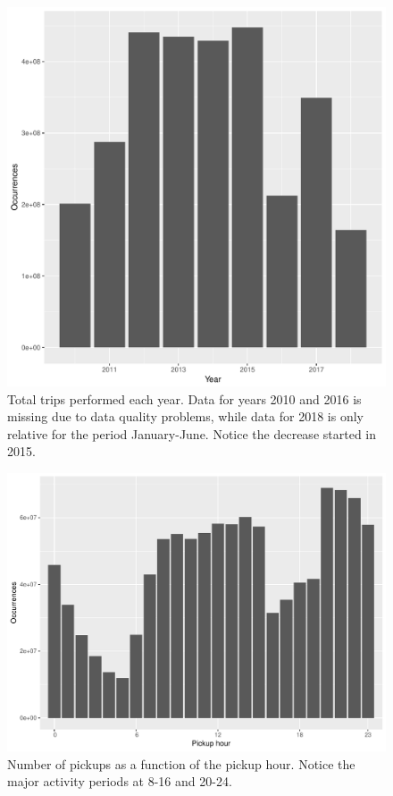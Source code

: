 \documentclass{acm_proc_article-sp-sigmod09}
\begin{document}
\begin{figure}
	\centering
	\includegraphics[width=1\columnwidth]{resources/base_plots/travels_by_year.pdf}
	\caption{Total trips performed each year. Data for years 2010 and 2016 is missing due to data quality problems, while data for 2018 is only relative for the period January-June. Notice the decrease started in 2015.}
	\label{fig:travelsByYear}
\end{figure}

\begin{figure}
	\centering
	\includegraphics[width=1\columnwidth]{resources/base_plots/pickup_hour_dist.pdf}
	\caption{Number of pickups as a function of the pickup hour. Notice the major activity periods at 8-16 and 20-24.}
	\label{fig:pickupHourDist}
\end{figure}
\end{document}
